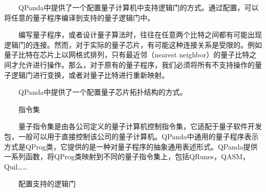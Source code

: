 \documentclass[a4paper,11pt,english]{sphinxmanual}
\begin{document}
\sphinxAtStartPar
  QPanda中提供了一个配置量子计算机中支持逻辑门的方式。通过配置，可以将任意的量子程序编译到支持的量子逻辑门中。

\sphinxAtStartPar
{}

\sphinxAtStartPar
  编写量子程序，或者设计量子算法时，往往在任意两个比特之间都有可能出现逻辑门的连接。然而，对于实际的量子芯片，有可能这种连接关系是受限的。例如量子比特在芯片上以网格式排列，只有最近邻（nearest neighbor）的量子比特之间才允许进行操作。那么，对于原有的量子程序，我们必须将所有不支持操作的量子逻辑门进行变换，或者对量子比特进行重新映射。

\sphinxAtStartPar
  QPanda中提供了一个配置量子芯片拓扑结构的方式。

\sphinxAtStartPar
  指令集

\sphinxAtStartPar
  量子指令集是由各公司定义的量子计算机控制指令集，它适配于量子软件开发包，一般可以用于直接控制该公司的量子计算机。QPanda中通用的量子程序表示方式是QProg类，它提供的是一种对量子程序的抽象通用表述形式。QPanda提供一系列函数，将QProg类映射到不同的量子指令集上，包括QRunes，QASM，Quil……

\sphinxAtStartPar
  配置支持的逻辑门
\end{document}
